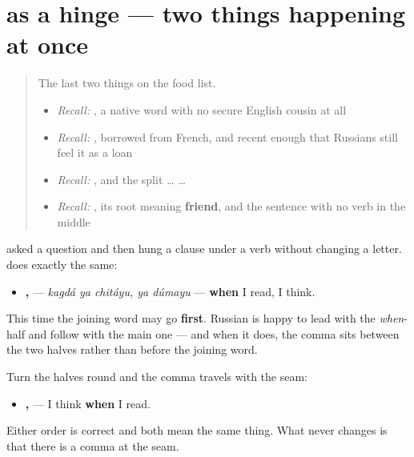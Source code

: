 \section[\texorpdfstring{\ru{когда} …, … (kagdá …, …)}{когда …, … (kagdá …, …)}]{ as a hinge — two things happening at once}

\label{lesson:RU-C19-kogda-soyuz}



\begin{quote}
The last two things on the food list.

\begin{itemize}
\raggedright
  \item \emph{Recall:} \emph{}, a native word with no secure English cousin at all
  \item \emph{Recall:} \emph{}, borrowed from French, and recent enough that Russians still feel it as a loan
  \item \emph{Recall:} \emph{}, and the split \emph{ …  …}
  \item \emph{Recall:} \emph{ }, its root meaning \textbf{friend}, and the sentence with no verb in the middle
\end{itemize}
\end{quote}

\begin{grammarlens}[title={Grammar lens — the question word, joining}]
\textbf{} asked a question and then hung a clause under a verb without changing a letter. \textbf{} does exactly the same:

\begin{itemize}
\raggedright
  \item \textbf{  ,  } — \emph{kagdá ya chitáyu, ya dúmayu} — \textbf{when} I read, I think.
\end{itemize}

This time the joining word may go \textbf{first}. Russian is happy to lead with the \emph{when}-half and follow with the main one — and when it does, the comma sits between the two halves rather than before the joining word.

Turn the halves round and the comma travels with the seam:

\begin{itemize}
\raggedright
  \item \textbf{ ,   } — I think \textbf{when} I read.
\end{itemize}

Either order is correct and both mean the same thing. What never changes is that there is a comma at the seam.
\end{grammarlens}

